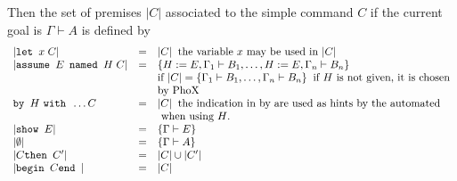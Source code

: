 Then the set of premises $|C|$ associated to the simple command $C$ if
the current goal is $\Gamma \vdash A$
is
defined by
$$
\begin{array}{lcl}
|\hbox{\tt let } x \; C| &=& |C| \;\; \hbox{the variable $x$ may be used in
$|C|$} \cr
|\hbox{\tt assume } E\, \hbox{ \tt named } H \; C| &=& \{H := E,\Gamma_1 \vdash B_1,
\dots, H := E,\Gamma_n \vdash B_n\}  \cr
&& \hbox{if } |C| = \{\Gamma_1 \vdash B_1,
\dots, \Gamma_n \vdash B_n\}\;\; \hbox{if $H$ is not given, it is
chosen} \cr
&& \hbox{by PhoX} \cr
\hbox{\tt by } H \hbox{ \tt with } \dots C &=& |C| \;\; \hbox{the
indication in by are used as
hints by the automated} \cr
&&\hbox{ when using $H$.}\cr
|\hbox{\tt show } E| &=& \{\Gamma\vdash E\} \cr
|\emptyset| &=& \{\Gamma\vdash A\} \cr
|C \hbox{\tt  then } C'| &=& |C| \cup |C'| \cr
|\hbox{\tt begin } C \hbox{\tt end }| &=& |C|
\end{array}
$$

